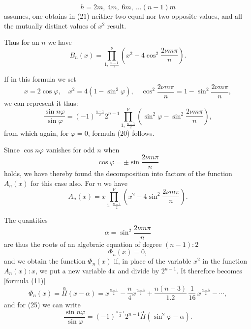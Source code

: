 \[
h = 2m,\ 4m,\ 6m,\ \ldots (n-1)m
\]
assumes, one obtains in (21) neither two equal nor two opposite values, and all the mutually distinct values of $x^2$ result.

Thus for an  $n$ we have
\[
B_n(x) = \prod\limits_{1,\,\frac{n-1}{2}}^{\nu} \left(x^2 - 4\cos^2\frac{2\nu m\pi}{n}\right). \tag{24}
\]

If in this formula we set
\[
x = 2\cos\varphi,\quad x^2 = 4(1-\sin^2\varphi),\quad \cos^2\frac{2\nu m\pi}{n} = 1 - \sin^2\frac{2\nu m\pi}{n},
\]
we can represent it thus:
\[
\frac{\sin n\varphi}{\sin\varphi} = (-1)^{\frac{n-1}{2}} 2^{n-1} \prod\limits_{1,\,\frac{n-1}{2}}^{\nu} \left(\sin^2\varphi - \sin^2\frac{2\nu m\pi}{n}\right), \tag{25}
\]
from which again, for $\varphi=0$, formula (20) follows.

Since $\cos n\varphi$ vanishes for odd $n$ when
\[
\cos\varphi = \pm \sin\frac{2\nu m\pi}{n}
\]
holds, we have thereby found the decomposition into factors of the function $A_n(x)$ for this case also. For  $n$ we have
\[
A_n(x) = x \prod\limits_{1,\,\frac{n-1}{2}}^{\nu} \left(x^2 - 4\sin^2\frac{2\nu m\pi}{n}\right). \tag{26}
\]

The quantities
\[
\alpha = \sin^2\frac{2\nu m\pi}{n} \tag{27}
\]
are thus the roots of an algebraic equation of degree $(n-1):2$
\[
\Phi_n(x) = 0,
\]
and we obtain the function $\Phi_n(x)$ if, in place of the variable $x^2$ in the function $A_n(x):x$, we put a new variable $4x$ and divide by $2^{n-1}$. It therefore becomes [formula (11)]
\[
\Phi_n(x) = \overset{\alpha}{\Pi}(x-\alpha)
= x^{\frac{n-1}{2}} - \frac{n}{4} x^{\frac{n-3}{2}} + \frac{n(n-3)}{1.2}\,\frac{1}{16}\, x^{\frac{n-5}{2}} - \cdots, \tag{28}
\]
and for (25) we can write
\[
\frac{\sin n\varphi}{\sin\varphi}
= (-1)^{\frac{n-1}{2}} 2^{n-1} \overset{\alpha}{\Pi}(\sin^2\varphi - \alpha). \tag{29}
\]
